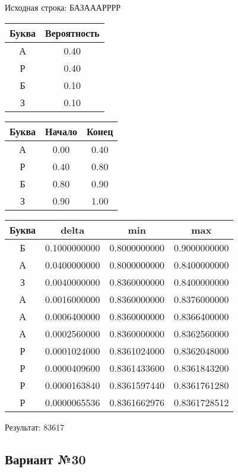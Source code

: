 \documentclass[a4paper, 12pt]{article}
\begin{document}
Исходная строка: БАЗАААРРРР\
\begin{center}
 \begin{tabular}{ |c|c| } 
  \hline
     Буква & Вероятность \\ \hline
А & 0.40\\\hline
Р & 0.40\\\hline
Б & 0.10\\\hline
З & 0.10
\\ \hline \end{tabular}
\end{center}
\begin{center}
 \begin{tabular}{ |c|c|c| } 
  \hline
     Буква & Начало & Конец \\ \hline
А & 0.00 & 0.40\\\hline
Р & 0.40 & 0.80\\\hline
Б & 0.80 & 0.90\\\hline
З & 0.90 & 1.00
\\ \hline \end{tabular}
\end{center}
\begin{center}
 \begin{tabular}{ |c|c|c|c| } 
  \hline
     Буква & delta & min & max \\ \hline
Б & 0.1000000000 & 0.8000000000 & 0.9000000000\\\hline
А & 0.0400000000 & 0.8000000000 & 0.8400000000\\\hline
З & 0.0040000000 & 0.8360000000 & 0.8400000000\\\hline
А & 0.0016000000 & 0.8360000000 & 0.8376000000\\\hline
А & 0.0006400000 & 0.8360000000 & 0.8366400000\\\hline
А & 0.0002560000 & 0.8360000000 & 0.8362560000\\\hline
Р & 0.0001024000 & 0.8361024000 & 0.8362048000\\\hline
Р & 0.0000409600 & 0.8361433600 & 0.8361843200\\\hline
Р & 0.0000163840 & 0.8361597440 & 0.8361761280\\\hline
Р & 0.0000065536 & 0.8361662976 & 0.8361728512
\\ \hline \end{tabular}
\end{center}
Результат: 83617
\pagebreak
\subsection{Вариант №30}
\end{document}
